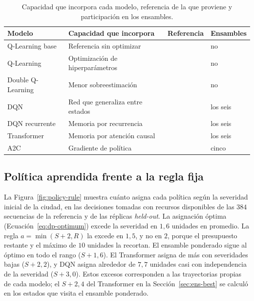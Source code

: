 \documentclass[../00_Main/Main.tex]{subfiles}
\begin{document}
\begin{table}[H]
\centering
\caption[Criterio de elecci\'on de los modelos]{Capacidad que incorpora
cada modelo, referencia de la que proviene y participaci\'on en los
ensambles.}
\label{tab:model-choice}
\small
\begin{tabular}{@{}llll@{}}
\toprule
\textbf{Modelo} & \textbf{Capacidad que incorpora} & \textbf{Referencia} & \textbf{Ensambles} \\
\midrule
Q-Learning base   & Referencia sin optimizar             & \citep{Watkins1992}    & no \\
Q-Learning        & Optimizaci\'on de hiperpar\'ametros  & \citep{Bergstra2011}   & no \\
Double Q-Learning & Menor sobreestimaci\'on              & \citep{Hasselt2010}    & no \\
DQN               & Red que generaliza entre estados     & \citep{Mnih2015}       & los seis \\
DQN recurrente    & Memoria por recurrencia              & \citep{Hausknecht2015} & los seis \\
Transformer       & Memoria por atenci\'on causal        & \citep{Parisotto2020}  & los seis \\
A2C               & Gradiente de pol\'itica              & \citep{Mnih2016}       & cinco \\
\bottomrule
\end{tabular}
\end{table}

\subsection{Pol\'itica aprendida frente a la regla fija}\label{ap:policy-rule}

La Figura~\ref{fig:policy-rule} muestra cu\'anto asigna cada pol\'itica
seg\'un la severidad inicial de la ciudad, en las decisiones tomadas con
recursos disponibles de las $384$ secuencias de la referencia y de las
r\'eplicas \emph{held-out}. La asignaci\'on \'optima
(Ecuaci\'on~\eqref{eq:dp-optimum}) excede la severidad en $1{,}6$ unidades
en promedio. La regla $a = \min(S + 2, R)$ la excede en $1{,}5$, y no
en $2$, porque el presupuesto restante y el m\'aximo de $10$ unidades la
recortan. El ensamble ponderado sigue al \'optimo en todo el rango
($S + 1{,}6$). El Transformer asigna de m\'as con severidades bajas
($S + 2{,}2$), y DQN asigna alrededor de $7{,}7$ unidades casi con
independencia de la severidad ($S + 3{,}0$). Estos excesos corresponden a
las trayectorias propias de cada modelo; el $S + 2{,}4$ del Transformer
en la Secci\'on~\ref{sec:ens-best} se calcul\'o en los estados que visita
el ensamble ponderado.
\end{document}
